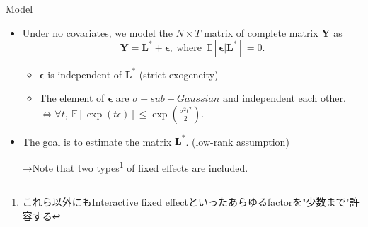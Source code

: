 \documentclass[xcolor=svgnames,aspectratio=169]{beamer}
\newcommand{\E}{\mathbb{E}}
\begin{document}
\begin{frame}{Model}
    \begin{itemize}
        \item Under no covariates, we model the $N\times T$ matrix of complete matrix $\mathbf{Y}$ as
        \[
        \mathbf{Y}=\mathbf{L^*}+\mathbf{\epsilon}, \ \text{where} \ \ \E[\mathbf{\epsilon}|\mathbf{L^*}]=0.
        \]
    \begin{tcolorbox}[colframe=lightgray,title=Assumption 1]
        \begin{itemize}
            \item $\mathbf{\epsilon}$ is independent of $\mathbf{L^*}$ (strict exogeneity)
            \item The element of $\mathbf{\epsilon}$ are $\sigma-sub-Gaussian$ and independent each other.
            $\Leftrightarrow \forall t, \ \E[\exp (t\epsilon)]\leq \exp (\frac{\sigma^2t^2}{2}).$
        \end{itemize}
    \end{tcolorbox}
        \item The goal is to estimate the matrix $\mathbf{L^*}$. (low-rank assumption) 
    
        →Note that two types\footnote{これら以外にもInteractive fixed effectといったあらゆるfactorを"少数まで"許容する} of fixed effects are included.
    \end{itemize}
\end{frame}
\end{document}
